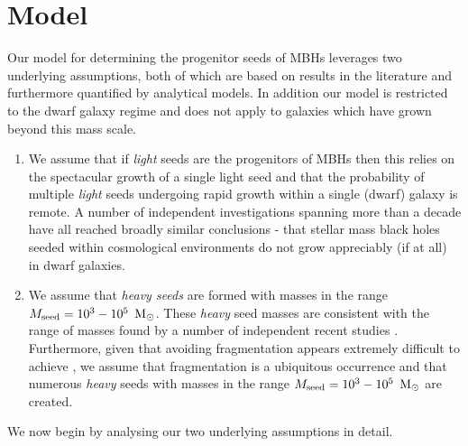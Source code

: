 \documentclass[twocolumn, tighten]{aastex631}
\newcommand{\msolar} {$\rm{M_{\odot}}~$}
\newcommand{\msolarc} {$\rm{M_{\odot}}$}
\begin{document}
\section{Model} \label{Sec:Model}
\noindent Our model for determining the progenitor seeds of MBHs leverages two underlying assumptions, both of which are based on results in the literature and 
furthermore quantified by analytical models. In addition our model is restricted to the dwarf 
galaxy regime and does not apply to galaxies which have grown beyond this mass scale. 

\begin{enumerate}
    \item We assume that if \textit{light} seeds are the progenitors of MBHs then this relies on the spectacular growth of a single light seed and that the probability of multiple \textit{light} seeds undergoing rapid growth within a single (dwarf) galaxy is remote. A number of independent investigations spanning more than a decade \citep{Volonteri_2008, Alvarez_2009, Milosavljevic_2009, Jeon_2012, Smith_2018} have all reached broadly similar conclusions - that stellar mass black holes seeded within cosmological environments do not grow appreciably (if at all) in dwarf galaxies. 
    \item We assume that \textit{heavy seeds} are formed with masses in the range $M_{\rm{seed}} = 10^3 - 10^5$ \msolarc. These \textit{heavy} seed masses are consistent with the range of masses found by a number of independent recent studies \cite[][]{Regan_2017, Latif_2014a, Regan_2020b}. Furthermore, given that avoiding fragmentation appears extremely difficult to achieve \citep{Regan_2018a}, we assume that fragmentation is a ubiquitous occurrence and that numerous \textit{heavy} seeds with masses in the range $M_{\rm{seed}} = 10^3 - 10^5$ \msolar are created.
\end{enumerate}

\noindent We now begin by analysing our two underlying assumptions in detail.\\
\end{document}
